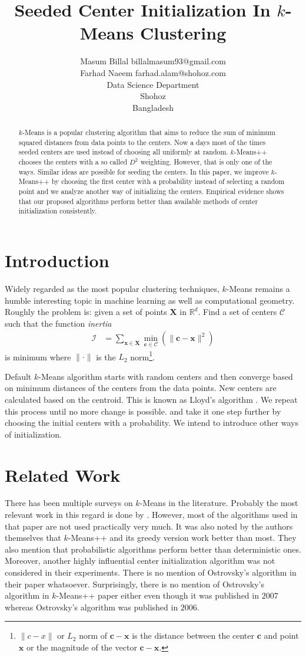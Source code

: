 \documentclass[twoside, 11pt]{article}
\title{Seeded Center Initialization In $k$-Means Clustering}
\author{
	\name Masum Billal 
	\email billalmasum93@gmail.com\\
	\name Farhad Naeem
	\email farhad.alam@shohoz.com\\
	\addr Data Science Department\\
	Shohoz\\
	Bangladesh
}
\newcommand{\x}{\mathbf{x}}
\newcommand{\X}{\mathbf{X}}
\renewcommand{\c}{\mathbf{c}}
\newcommand{\C}{\mathcal{C}}
\begin{document}
	
	\maketitle
		\begin{abstract}%
			$k$-Means is a popular clustering algorithm that aims to reduce the sum of minimum squared distances from data points to the centers. Now a days most of the times seeded centers are used instead of choosing all uniformly at random. $k$-Means++ chooses the centers with a so called $D^2$ weighting. However, that is only one of the ways. Similar ideas are possible for seeding the centers. In this paper, we improve $k$-Means++ by choosing the first center with a probability instead of selecting a random point and we analyze another way of initializing the centers. Empirical evidence shows that our proposed algorithms perform better than available methods of center initialization consistently.
		\end{abstract}
	\section{Introduction}
	Widely regarded as the most popular clustering techniques, $k$-Means remains a humble interesting topic in machine learning as well as computational geometry. Roughly the problem is: given a set of points $\X$ in $\mathbb{R}^d$. Find a set of centers $\mathcal{C}$ such that the function \textit{inertia}
		\begin{align*}
			\mathcal{I} & = \sum_{\x\in\X}\min_{\c\in\C}(\|\c-\x\|^2)
		\end{align*}
	is minimum where $\|\cdot\|$ is the $L_2$ norm\footnote{$\|c-x\|$ or $L_2$ norm of $\c-\x$ is the distance between the center $\c$ and point $\x$ or the magnitude of the vector $\c-\x$.}.
	
	Default $k$-Means algorithm starts with random centers and then converge based on minimum distances of the centers from the data points. New centers are calculated based on the centroid. This is known as Lloyd's algorithm \citep{lloyd}. We repeat this process until no more change is possible. \cite{ostrovsky} and \cite{kmeans++} take it one step further by choosing the initial centers with a probability. We intend to introduce other ways of initialization.
	\section{Related Work}
	There has been multiple surveys on $k$-Means in the literature. Probably the most relevant work in this regard is done by \cite{celebi}. However, most of the algorithms used in that paper are not used practically very much. It was also noted by the authors themselves that $k$-Means++ and its greedy version work better than most. They also mention that probabilistic algorithms perform better than deterministic ones. Moreover, another highly influential center initialization algorithm \citep{ostrovsky} was not considered in their experiments. There is no mention of Ostrovsky's algorithm in their paper whatsoever. Surprisingly, there is no mention of Ostrovsky's algorithm in $k$-Means++ paper either even though it was published in $2007$ whereas Ostrovsky's algorithm was published in $2006$.
	
\end{document}
